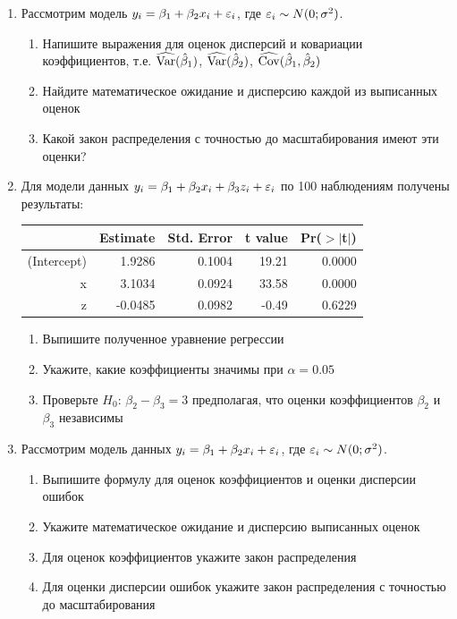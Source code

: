\documentclass[12pt, a4paper]{article}\usepackage[]{graphicx}\usepackage[]{color}
\begin{document}
\begin{enumerate}
\item Рассмотрим модель $y_i=\beta_1 + \beta_2 x_i +\varepsilon_i$, где $\varepsilon_i \sim N(0;\sigma^2)$.

\begin{enumerate}
\item Напишите выражения для оценок дисперсий и ковариации коэффициентов, т.е. $\widehat{\operatorname{Var}}(\hat{\beta}_1)$, $\widehat{\operatorname{Var}}(\hat{\beta}_2)$, $\widehat{\operatorname{Cov}}(\hat{\beta}_1,\hat{\beta}_2)$
\item Найдите математическое ожидание и дисперсию каждой из выписанных оценок
\item Какой закон распределения с точностью до масштабирования имеют эти оценки?
\end{enumerate}

\item Для модели данных $y_i=\beta_1 + \beta_2 x_i + \beta_3 z_i + \varepsilon_i$ по 100 наблюдениям получены результаты:

\begin{table}[ht]
\centering
\begin{tabular}{rrrrr}
  \hline
 & Estimate & Std. Error & t value & Pr($>$$|$t$|$) \\ 
  \hline
(Intercept) & 1.9286 & 0.1004 & 19.21 & 0.0000 \\ 
  x & 3.1034 & 0.0924 & 33.58 & 0.0000 \\ 
  z & -0.0485 & 0.0982 & -0.49 & 0.6229 \\ 
   \hline
\end{tabular}
\end{table}


\begin{enumerate}
\item Выпишите полученное уравнение регрессии
\item Укажите, какие коэффициенты значимы при $\alpha=0.05$
\item Проверьте $H_0$: $\beta_2-\beta_3=3$ предполагая, что оценки коэффициентов $\beta_2$ и  $\beta_3$ независимы
\end{enumerate}

\item Рассмотрим модель данных $y_i=\beta_1 + \beta_2 x_i + \varepsilon_i$, где $\varepsilon_i \sim N(0;\sigma^2)$.
\begin{enumerate}
\item Выпишите формулу для оценок коэффициентов и оценки дисперсии ошибок
\item Укажите математическое ожидание и дисперсию выписанных оценок
\item Для оценок коэффициентов укажите закон распределения
\item Для оценки дисперсии ошибок укажите закон распределения с точностью до масштабирования
\end{enumerate}

\end{enumerate}
\end{document}
